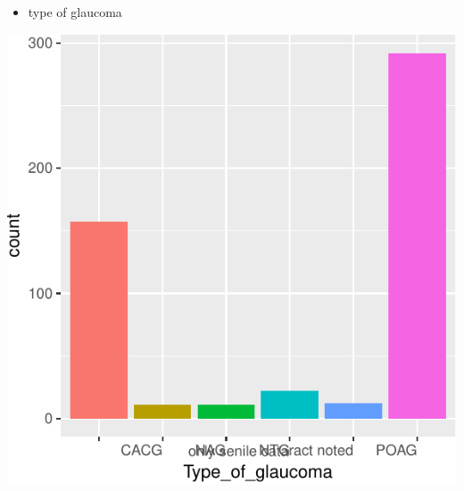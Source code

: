 \documentclass[ignorenonframetext,]{beamer}
\providecommand{\tightlist}{%
  \setlength{\itemsep}{0pt}\setlength{\parskip}{0pt}}
\begin{document}
\begin{frame}{}

\begin{itemize}
\tightlist
\item
  type of glaucoma
\end{itemize}

\includegraphics{analisi_exp_markdown_files/figure-beamer/unnamed-chunk-5-1.pdf}

\end{frame}
\end{document}
